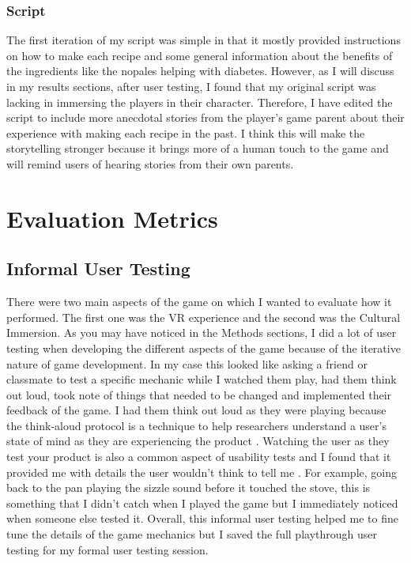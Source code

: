 \documentclass[10pt,twocolumn]{article}
\begin{document}
\subsubsection{Script}
The first iteration of my script was simple in that it mostly provided instructions on how to make each recipe and some general information about the benefits of the ingredients like the nopales helping with diabetes. However, as I will discuss in my results sections, after user testing, I found that my original script was lacking in immersing the players in their character. Therefore, I have edited the script to include more anecdotal stories from the player’s game parent about their experience with making each recipe in the past. I think this will make the storytelling stronger because it brings more of a human touch to the game and will remind users of hearing stories from their own parents.

\section{Evaluation Metrics}
\subsection{Informal User Testing}
There were two main aspects of the game on which I wanted to evaluate how it performed. The first one was the VR experience and the second was the Cultural Immersion. As you may have noticed in the Methods sections, I did a lot of user testing when developing the different aspects of the game because of the iterative nature of game development. In my case this looked like asking a friend or classmate to test a specific mechanic while I watched them play, had them think out loud, took note of things that needed to be changed and implemented their feedback of the game. I had them think out loud as they were playing because the think-aloud protocol is a technique to help researchers understand a user's state of mind as they are experiencing the product \cite{testQues2021}. Watching the user as they test your product is also a common aspect of usability tests and I found that it provided me with details the user wouldn't think to tell me \cite{testing1012019}. For example, going back to the pan playing the sizzle sound before it touched the stove, this is something that I didn’t catch when I played the game but I immediately noticed when someone else tested it. Overall, this informal user testing helped me to fine tune the details of the game mechanics but I saved the full playthrough user testing for my formal user testing session.
\end{document}
